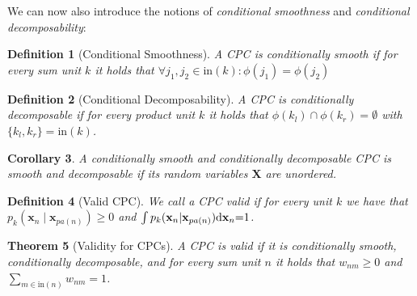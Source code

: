 \documentclass[letterpaper]{article} %
\newtheorem{theorem}{Theorem}[section]
\newtheorem{definition}[theorem]{Definition}
\newtheorem{corollary}[theorem]{Corollary}
\newcommand{\inputs}{\ensuremath{\text{in}}}
\newcommand{\Xvars}{\ensuremath{\mathbf{X}}}
\newcommand{\xvars}{\ensuremath{\mathbf{x}}}
\newcommand{\weight}{\ensuremath{w}}
\newcommand{\scope}{\ensuremath{\phi}}
\newcommand{\parents}{\ensuremath{{pa}}}
\begin{document}
We can now also introduce the notions of \textit{conditional smoothness} and \textit{conditional decomposability}:
\begin{definition}[Conditional Smoothness]
	A CPC is conditionally smooth if for every sum unit $k$ it holds that
	$\forall j_1, j_2 {\in} \inputs(k):  \scope(j_1){=}\scope(j_2) $
\end{definition}

\begin{definition}[Conditional Decomposability]
	A CPC is conditionally decomposable if for every product unit
	$k$ it holds that $\scope (k_l) \cap \scope (k_r) = \emptyset$ with $\{k_l, k_r\}= \inputs (k)$.
\end{definition}



\begin{corollary}
	A conditionally smooth and conditionally decomposable CPC is smooth and decomposable if its random variables $\Xvars$ are unordered.
\end{corollary}

\begin{definition}[Valid CPC]
	\label{def:valid_cpc}
	We call a CPC valid if for every unit $k$ we have that $p_k(\xvars_n {\mid} \xvars_{\parents(n)}){\geq} 0$ and $\int p_k(\xvars_n {\mid} \xvars_{\parents(n)}) \differential \xvars_n{=}1$.
\end{definition}



\begin{theorem}[Validity for CPCs]
	A CPC is valid if it is conditionally smooth, conditionally decomposable, and for every sum unit $n$ it holds that $\weight_{nm}{\geq} 0$ and $\sum_{m\in\inputs(n)} \weight_{nm}{=}1$.
\end{theorem}
\end{document}

